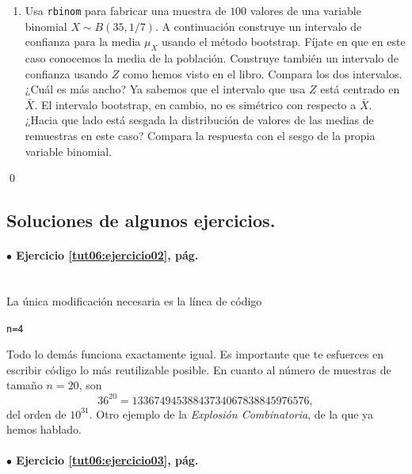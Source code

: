 \documentclass[10pt,a4paper]{article}\usepackage[]{graphicx}\usepackage[]{color}
\makeatletter
\newcommand{\hlnum}[1]{\textcolor[rgb]{0.686,0.059,0.569}{#1}}%
\newcommand{\hlstd}[1]{\textcolor[rgb]{0.345,0.345,0.345}{#1}}%
\newcommand{\hlkwb}[1]{\textcolor[rgb]{0.69,0.353,0.396}{#1}}%
\newenvironment{kframe}{%
 \def\at@end@of@kframe{}%
 \ifinner\ifhmode%
  \def\at@end@of@kframe{\end{minipage}}%
  \begin{minipage}{\columnwidth}%
 \fi\fi%
 \def\FrameCommand##1{\hskip\@totalleftmargin \hskip-\fboxsep
 \colorbox{shadecolor}{##1}\hskip-\fboxsep
     \hskip-\linewidth \hskip-\@totalleftmargin \hskip\columnwidth}%
 \MakeFramed {\advance\hsize-\width
   \@totalleftmargin\z@ \linewidth\hsize
   \@setminipage}}%
 {\par\unskip\endMakeFramed%
 \at@end@of@kframe}
\newenvironment{knitrout}{}{} %
\newcounter {cont01}
\makeatother
\begin{document}
\begin{ejercicio}
\begin{enumerate}
  \item Usa {\tt rbinom} para fabricar una muestra de $100$ valores de una variable binomial $X\sim B(35, 1/7)$. A continuación construye un intervalo de confianza para la media $\mu_X$ usando el método bootstrap. Fíjate en que en este caso conocemos la media de la población. Construye también un intervalo de confianza usando $Z$ como hemos visto en el libro. Compara los dos intervalos. ¿Cuál es más ancho? Ya sabemos que el intervalo que usa $Z$ está centrado en $\bar{X}$. El intervalo bootstrap, en cambio, no es simétrico con respecto a $\bar{X}$. ¿Hacia que lado está sesgada la distribución de valores de las medias de remuestras en este caso? Compara la respuesta con el sesgo de la propia variable binomial.

\end{enumerate}
\qed
\end{ejercicio}


\subsection*{Soluciones de algunos ejercicios.}
\label{tut06:subsec:SolucionesAlgunosEjercicios}


\paragraph{\bf $\bullet$ Ejercicio \ref{tut06:ejercicio02}, pág. \pageref{tut06:ejercicio02}}
\label{tut06:ejercicio02:sol}\quad\\

La única modificación necesaria es la línea de código
\begin{knitrout}
\color{fgcolor}\begin{kframe}
\begin{alltt}
\hlstd{n} \hlkwb{=} \hlnum{4}
\end{alltt}
\end{kframe}
\end{knitrout}
Todo lo demás funciona exactamente igual. Es importante que te esfuerces en escribir código lo más reutilizable posible. En cuanto al número de muestras de tamaño $n=20$, son
\[36^{20} = 13367494538843734067838845976576,\]
del orden de $10^{31}$. Otro ejemplo de la {\em Explosión Combinatoria}, de la que ya hemos hablado.

\paragraph{\bf $\bullet$ Ejercicio \ref{tut06:ejercicio03}, pág. \pageref{tut06:ejercicio03}}
\label{tut06:ejercicio03:sol}\quad\\
\end{document}
